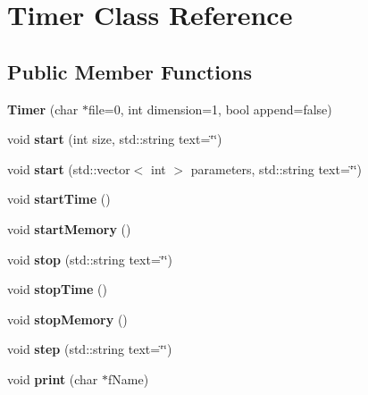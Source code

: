 \hypertarget{classTimer}{\section{Timer Class Reference}
\label{classTimer}
}
\subsection*{Public Member Functions}
\begin{DoxyCompactItemize}
\item 
\hypertarget{classTimer_a098158b611784dcc5018375b302483a8}{{\bfseries Timer} (char $\ast$file=0, int dimension=1, bool append=false)}\label{classTimer_a098158b611784dcc5018375b302483a8}

\item 
\hypertarget{classTimer_acc61f0c4f2c1e26ba0bb62d367f0977e}{void {\bfseries start} (int size, std\-::string text=\char`\"{}\char`\"{})}\label{classTimer_acc61f0c4f2c1e26ba0bb62d367f0977e}

\item 
\hypertarget{classTimer_a7a3752e22180b31454af4f37a8fee225}{void {\bfseries start} (std\-::vector$<$ int $>$ parameters, std\-::string text=\char`\"{}\char`\"{})}\label{classTimer_a7a3752e22180b31454af4f37a8fee225}

\item 
\hypertarget{classTimer_a5771baafd265be353ab78a4bb77329f9}{void {\bfseries start\-Time} ()}\label{classTimer_a5771baafd265be353ab78a4bb77329f9}

\item 
\hypertarget{classTimer_afada34fd58fb4729b9a6ee7a445f5133}{void {\bfseries start\-Memory} ()}\label{classTimer_afada34fd58fb4729b9a6ee7a445f5133}

\item 
\hypertarget{classTimer_afc259e85201ab94f291b36ed97dbd5e2}{void {\bfseries stop} (std\-::string text=\char`\"{}\char`\"{})}\label{classTimer_afc259e85201ab94f291b36ed97dbd5e2}

\item 
\hypertarget{classTimer_a71c4bba47ccad8ed4131922d1cd6d689}{void {\bfseries stop\-Time} ()}\label{classTimer_a71c4bba47ccad8ed4131922d1cd6d689}

\item 
\hypertarget{classTimer_a55ad7a96c2e75c4a1a7209c8eb89ee9d}{void {\bfseries stop\-Memory} ()}\label{classTimer_a55ad7a96c2e75c4a1a7209c8eb89ee9d}

\item 
\hypertarget{classTimer_a88fa29d9f2422df0ad2ed43b1c28cc04}{void {\bfseries step} (std\-::string text=\char`\"{}\char`\"{})}\label{classTimer_a88fa29d9f2422df0ad2ed43b1c28cc04}

\item 
\hypertarget{classTimer_af29968e93e56c8bf1de7c9f559dfae23}{void {\bfseries print} (char $\ast$f\-Name)}\label{classTimer_af29968e93e56c8bf1de7c9f559dfae23}

\end{DoxyCompactItemize}
